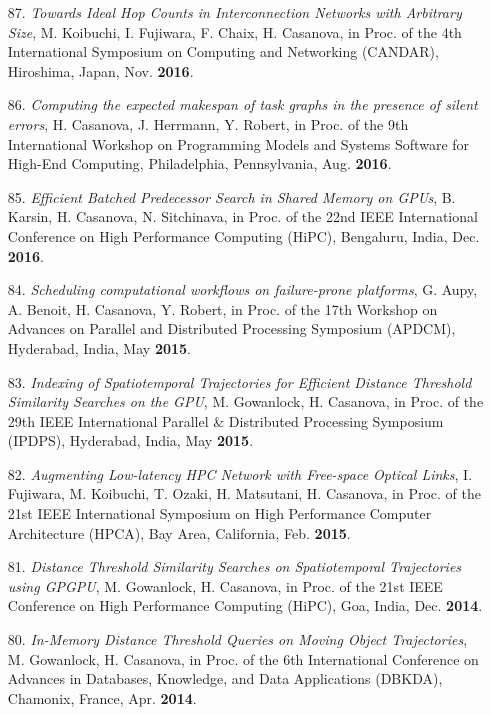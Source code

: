 \begin{enumerate}
\item [87.] {\it  Towards Ideal Hop Counts in Interconnection Networks with
Arbitrary Size}, M. Koibuchi, I. Fujiwara, F. Chaix, H. Casanova, in Proc.
of the 4th International Symposium on Computing and Networking (CANDAR),
Hiroshima, Japan, Nov.  {\bf 2016}.

\item [86.] {\it Computing the expected makespan of task graphs in the presence of silent errors},
H. Casanova, J. Herrmann, Y. Robert,
in Proc. of the 9th International Workshop on Programming Models and Systems Software for High-End Computing, Philadelphia, Pennsylvania, Aug. {\bf 2016}.


\item [85.] {\it Efficient Batched Predecessor Search in Shared Memory on GPUs},
B. Karsin, H. Casanova, N. Sitchinava, in Proc. of 
the 22nd IEEE International Conference on High Performance Computing (HiPC),
Bengaluru, India, Dec. {\bf 2016}. 

\item [84.] {\it Scheduling computational workflows on failure-prone
platforms}, G. Aupy, A. Benoit, H. Casanova, Y.  Robert, in Proc. of
the 17th Workshop on Advances on Parallel and Distributed Processing
Symposium (APDCM), Hyderabad, India, May {\bf 2015}.



\item [83.] {\it Indexing of Spatiotemporal Trajectories for Efficient Distance Threshold Similarity Searches on the GPU}, M. Gowanlock, H. Casanova, 
in Proc. of the 29th IEEE International Parallel \& Distributed Processing Symposium (IPDPS), Hyderabad, India, May {\bf 2015}.


\item [82.] {\it Augmenting Low-latency HPC Network with Free-space Optical Links}, I. Fujiwara, M. Koibuchi, T. Ozaki, H. Matsutani, H. Casanova,
in Proc. of the 21st IEEE International Symposium on High Performance Computer Architecture (HPCA), Bay Area, California, Feb. {\bf 2015}.


\item [81.] {\it Distance Threshold Similarity Searches on Spatiotemporal
Trajectories using GPGPU}, M. Gowanlock, H. Casanova, in Proc. of the 21st
IEEE Conference on High Performance Computing (HiPC), Goa, India,
Dec. {\bf 2014}.

\item [80.] {\it In-Memory Distance Threshold Queries on Moving Object
Trajectories}, M. Gowanlock, H. Casanova, in Proc. of the 6th
International Conference on Advances in Databases, Knowledge, and Data
Applications (DBKDA), Chamonix, France, Apr. {\bf 2014}.


\end{enumerate}
